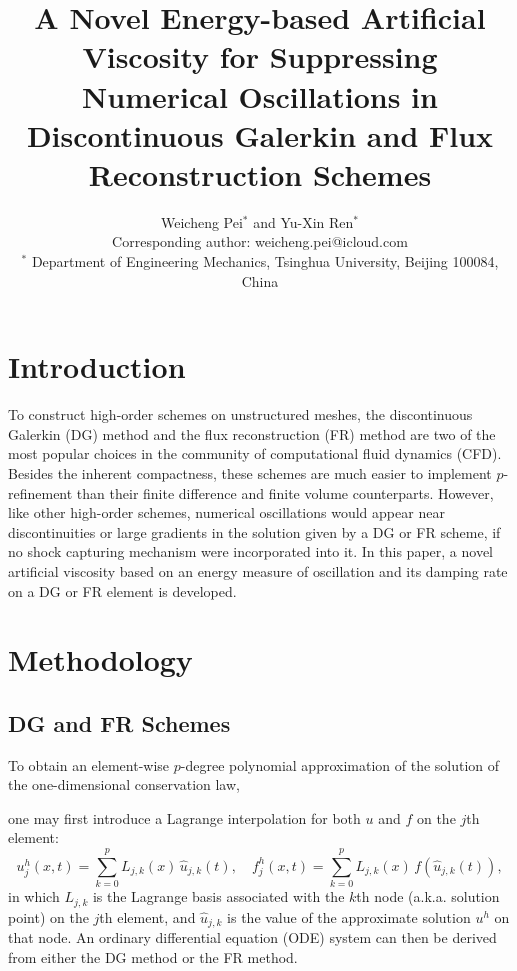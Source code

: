 \documentclass[10pt]{article}
\title{
\bf A Novel Energy-based Artificial Viscosity for Suppressing Numerical Oscillations in Discontinuous Galerkin and Flux Reconstruction Schemes
}
\author{
Weicheng Pei$^{*}$ and Yu-Xin Ren$^{*}$\\
Corresponding author: weicheng.pei@icloud.com\\
$^{*}$ Department of Engineering Mechanics, Tsinghua University, Beijing 100084, China
}
\date{}
\newcommand{\ignore}[1]{}
\begin{document}
\maketitle
\afterpage{\fancyhead{}}

\centerline{
}
\vskip0.5cm 

\section{Introduction}
To construct high-order schemes on unstructured meshes, the discontinuous Galerkin (DG) method \cite{Li_2020} and the flux reconstruction (FR) method \cite{Huynh_2014} are two of the most popular choices in the community of computational fluid dynamics (CFD).
%
Besides the inherent compactness, these schemes are much easier to implement $p$-refinement than their finite difference and finite volume counterparts.
%
However, like other high-order schemes, numerical oscillations would appear near discontinuities or large gradients in the solution given by a DG or FR scheme, if no shock capturing mechanism were incorporated into it.
%
In this paper, a novel artificial viscosity based on an energy measure of oscillation and its damping rate on a DG or FR element is developed.
\ignore{
%
The oscillation energy, which measures the amplitude of numerical oscillations on a given element, is obtained by evaluating the $L_2$-norm of the difference between the numerical solutions on the element and its neighbors.
%
The damping rate of this energy on an element can be derived under the assumptions of linear flux--gradient relation and constant viscosity distribution.
%
The value of viscosity for suppressing numerical oscillations is obtained by taking the ratio of the oscillation energy with respect to the product of its damping rate and prescribed time step.
%
Such element-wise constant viscosity distribution is reconstructed to be $C_0$ continuous on element interfaces.
}

\section{Methodology}
\subsection{DG and FR Schemes}
To obtain an element-wise $p$-degree polynomial approximation of the solution of the one-dimensional conservation law,
\ignore{
$$
\pdv{u}{t}+\pdv{f(u)}{x}=0,
$$
}
one may first introduce a Lagrange interpolation for both $u$ and $f$ on the $j$th element:
$$
u^h_j(x,t) = \sum_{k=0}^{p} L_{j,k}(x)\,\hat{u}_{j,k}(t),\quad
f^h_j(x,t) = \sum_{k=0}^{p} L_{j,k}(x)\,f(\hat{u}_{j,k}(t)),
$$
in which $L_{j,k}$ is the Lagrange basis associated with the $k$th node (a.k.a. solution point) on the $j$th element, and $\hat{u}_{j,k}$ is the value of the approximate solution $u^h$ on that node.
An ordinary differential equation (ODE) system can then be derived from either the DG method or the FR method.
\end{document}
